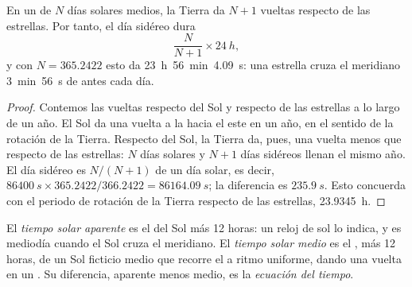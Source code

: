 \begin{proposition}\label{prop:b1:spherical-astronomy:sidereal-day}
En un  de $N$ días solares medios, la Tierra da $N + 1$ vueltas
respecto de las estrellas. Por tanto, el día sidéreo dura
\[
  \frac{N}{N + 1}\times\qty{24}{h},
\]
y con $N = 365.2422$ esto da \qty{23}{h}~\qty{56}{min}~\qty{4.09}{s}: una estrella
cruza el meridiano \qty{3}{min}~\qty{56}{s} de  antes cada día.
\end{proposition}

\begin{proof}
Contemos las vueltas respecto del Sol y respecto de las estrellas a lo largo de un
año. El Sol da una vuelta a la  hacia el este en un año, en el sentido de
la rotación de la Tierra. Respecto del Sol, la Tierra da, pues, una vuelta menos
que respecto de las estrellas: $N$ días solares y $N + 1$ días sidéreos llenan el
mismo año. El día sidéreo es $N/(N+1)$ de un día solar, es decir,
$\qty{86400}{s}\times 365.2422/366.2422 = \qty{86164.09}{s}$; la diferencia es
$\qty{235.9}{s}$. Esto concuerda con el periodo de rotación de la Tierra respecto de
las estrellas, \qty{23.9345}{h}.
\end{proof}

\begin{definition}\label{def:b1:spherical-astronomy:solar-time}
El \emph{tiempo solar aparente} es el 
del Sol más 12 horas: un reloj de sol lo indica, y es mediodía cuando el Sol cruza
el meridiano. El \emph{tiempo solar medio} es el , más 12 horas, de un Sol ficticio medio que recorre el  a
ritmo uniforme, dando una vuelta en un . Su diferencia, aparente menos
medio, es la \emph{ecuación del tiempo}.
\end{definition}

